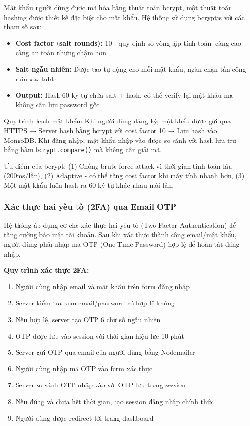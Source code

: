 \documentclass[12pt,a4paper]{article}
\begin{document}
Mật khẩu người dùng được mã hóa bằng thuật toán bcrypt, một thuật toán hashing được thiết kế đặc biệt cho mất khẩu. Hệ thống sử dụng bcryptjs với các tham số sau:

\begin{itemize}
  \item \textbf{Cost factor (salt rounds):} 10 - quy định số vòng lặp tính toán, càng cao càng an toàn nhưng chậm hơn
  \item \textbf{Salt ngẫu nhiên:} Được tạo tự động cho mỗi mật khẩu, ngăn chặn tấn công rainbow table
  \item \textbf{Output:} Hash 60 ký tự chứa salt + hash, có thể verify lại mật khẩu mà không cần lưu password gốc
\end{itemize}

Quy trình hash mật khẩu: Khi người dùng đăng ký, mật khẩu được gửi qua HTTPS → Server hash bằng bcrypt với cost factor 10 → Lưu hash vào MongoDB. Khi đăng nhập, mật khẩu nhập vào được so sánh với hash lưu trữ bằng hàm \texttt{bcrypt.compare()} mà không cần giải mã.

Ưu điểm của bcrypt: (1) Chống brute-force attack vì thời gian tính toán lâu (200ms/lần), (2) Adaptive - có thể tăng cost factor khi máy tính nhanh hơn, (3) Một mật khẩu luôn hash ra 60 ký tự khác nhau mỗi lần.

\subsubsection{Xác thực hai yếu tố (2FA) qua Email OTP}

Hệ thống áp dụng cơ chế xác thực hai yếu tố (Two-Factor Authentication) để tăng cường bảo mật tài khoản. Sau khi xác thực thành công email/mật khẩu, người dùng phải nhập mã OTP (One-Time Password) hợp lệ để hoàn tất đăng nhập.

\textbf{Quy trình xác thực 2FA:}

\begin{enumerate}
  \item Người dùng nhập email và mật khẩu trên form đăng nhập
  \item Server kiểm tra xem email/password có hợp lệ không
  \item Nếu hợp lệ, server tạo OTP 6 chữ số ngẫu nhiên
  \item OTP được lưu vào session với thời gian hiệu lực 10 phút
  \item Server gửi OTP qua email của người dùng bằng Nodemailer
  \item Người dùng nhập mã OTP vào form xác thực
  \item Server so sánh OTP nhập vào với OTP lưu trong session
  \item Nếu đúng và chưa hết thời gian, tạo session đăng nhập chính thức
  \item Người dùng được redirect tới trang dashboard
\end{enumerate}
\end{document}

